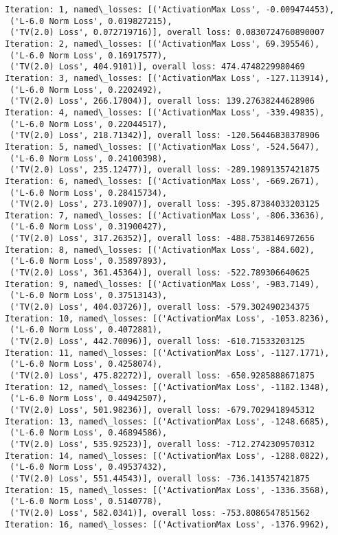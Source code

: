 \documentclass[10pt]{article}
\begin{document}
    \begin{Verbatim}[commandchars=\\\{\}]
Iteration: 1, named\_losses: [('ActivationMax Loss', -0.009474453),
 ('L-6.0 Norm Loss', 0.019827215),
 ('TV(2.0) Loss', 0.072719716)], overall loss: 0.0830724760890007
Iteration: 2, named\_losses: [('ActivationMax Loss', 69.395546),
 ('L-6.0 Norm Loss', 0.16917577),
 ('TV(2.0) Loss', 404.9101)], overall loss: 474.4748229980469
Iteration: 3, named\_losses: [('ActivationMax Loss', -127.113914),
 ('L-6.0 Norm Loss', 0.2202492),
 ('TV(2.0) Loss', 266.17004)], overall loss: 139.27638244628906
Iteration: 4, named\_losses: [('ActivationMax Loss', -339.49835),
 ('L-6.0 Norm Loss', 0.22044517),
 ('TV(2.0) Loss', 218.71342)], overall loss: -120.56446838378906
Iteration: 5, named\_losses: [('ActivationMax Loss', -524.5647),
 ('L-6.0 Norm Loss', 0.24100398),
 ('TV(2.0) Loss', 235.12477)], overall loss: -289.19891357421875
Iteration: 6, named\_losses: [('ActivationMax Loss', -669.2671),
 ('L-6.0 Norm Loss', 0.28415734),
 ('TV(2.0) Loss', 273.10907)], overall loss: -395.87384033203125
Iteration: 7, named\_losses: [('ActivationMax Loss', -806.33636),
 ('L-6.0 Norm Loss', 0.31900427),
 ('TV(2.0) Loss', 317.26352)], overall loss: -488.7538146972656
Iteration: 8, named\_losses: [('ActivationMax Loss', -884.602),
 ('L-6.0 Norm Loss', 0.35897893),
 ('TV(2.0) Loss', 361.45364)], overall loss: -522.789306640625
Iteration: 9, named\_losses: [('ActivationMax Loss', -983.7149),
 ('L-6.0 Norm Loss', 0.37513143),
 ('TV(2.0) Loss', 404.03726)], overall loss: -579.302490234375
Iteration: 10, named\_losses: [('ActivationMax Loss', -1053.8236),
 ('L-6.0 Norm Loss', 0.4072881),
 ('TV(2.0) Loss', 442.70096)], overall loss: -610.71533203125
Iteration: 11, named\_losses: [('ActivationMax Loss', -1127.1771),
 ('L-6.0 Norm Loss', 0.4258074),
 ('TV(2.0) Loss', 475.82272)], overall loss: -650.9285888671875
Iteration: 12, named\_losses: [('ActivationMax Loss', -1182.1348),
 ('L-6.0 Norm Loss', 0.44942507),
 ('TV(2.0) Loss', 501.98236)], overall loss: -679.7029418945312
Iteration: 13, named\_losses: [('ActivationMax Loss', -1248.6685),
 ('L-6.0 Norm Loss', 0.46894586),
 ('TV(2.0) Loss', 535.92523)], overall loss: -712.2742309570312
Iteration: 14, named\_losses: [('ActivationMax Loss', -1288.0822),
 ('L-6.0 Norm Loss', 0.49537432),
 ('TV(2.0) Loss', 551.44543)], overall loss: -736.141357421875
Iteration: 15, named\_losses: [('ActivationMax Loss', -1336.3568),
 ('L-6.0 Norm Loss', 0.5140778),
 ('TV(2.0) Loss', 582.0341)], overall loss: -753.8086547851562
Iteration: 16, named\_losses: [('ActivationMax Loss', -1376.9962),

\end{Verbatim}
\end{document}
